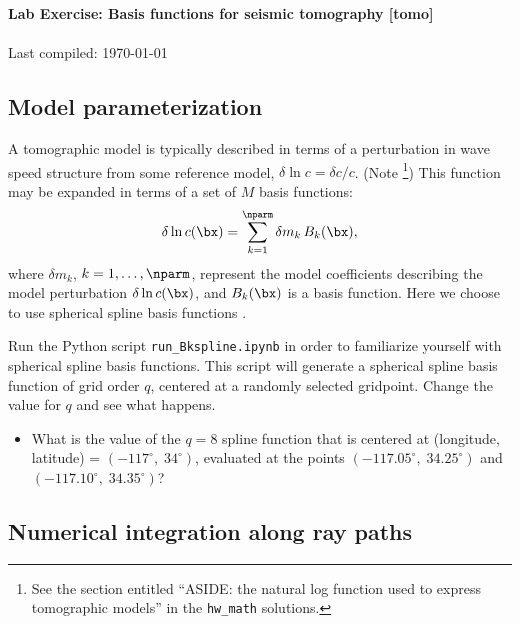 \documentclass[11pt,titlepage,fleqn]{article}
\begin{document}

\begin{spacing}{1.2}
\centering
{\large \bf Lab Exercise: Basis functions for seismic tomography [tomo]} \\
\cltag\ \\
Last compiled: \today
\end{spacing}


\subsection*{Model parameterization}

A tomographic model is typically described in terms of a perturbation in wave speed structure from some reference model, \ie $\delta\ln c = \delta c/c$.
(Note \footnote{See the section entitled ``ASIDE: the natural log function used to express tomographic models'' in the {\tt hw\_math} solutions.})
This function may be expanded in terms of a set of $M$ basis functions:
%
\begin{equation}
\delta\ln c(\bx)=\sum_{k=1}^{\nparm} \delta m_k\,B_k(\bx),
\label{dlnv}
\end{equation}
%
where $\delta m_k$, $k=1,\ldots,\nparm$, represent the model coefficients describing the model perturbation $\delta\ln c(\bx)$, and $B_k(\bx)$ is a basis function. Here we choose to use spherical spline basis functions \citep{WangDahlen1995spline,Wang1998}.

Run the Python script \verb+run_Bkspline.ipynb+ in order to familiarize yourself with spherical spline basis functions. This script will generate a spherical spline basis function of grid order $q$, centered at a randomly selected gridpoint. Change the value for $q$ and see what happens. 

\begin{itemize}
\item What is the value of the $q=8$ spline function that is centered at (longitude, latitude) = $(-117^\circ,\;34^\circ)$, evaluated at the points $(-117.05^\circ,\;34.25^\circ)$ and $(-117.10^\circ,\;34.35^\circ)$?
\end{itemize}


\subsection*{Numerical integration along ray paths}
\end{document}

